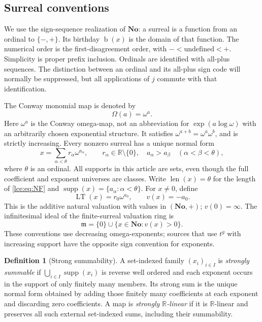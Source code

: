 \documentclass[11pt,letterpaper]{article}
\numberwithin{equation}{section}
\theoremstyle{definition}
\newtheorem{definition}[theorem]{Definition}
\theoremstyle{remark}
\newcommand{\No}{\mathbf{No}}
\newcommand{\R}{\mathbb R}
\newcommand{\supp}{\operatorname{supp}}
\newcommand{\LT}{\operatorname{LT}}
\newcommand{\bd}{\operatorname{b}}
\newcommand{\len}{\operatorname{len}}
\newcommand{\Om}{\Omega}
\newcommand{\infideal}{\mathfrak m}
\begin{document}
\subsection{Surreal conventions}
We use the sign-sequence realization of $\No$: a surreal is a function from
an ordinal to $\{-,+\}$. Its birthday $\bd(x)$ is the domain of that function.
The numerical order is the first-disagreement order, with
$-<\text{undefined}<+$. Simplicity is proper prefix inclusion.
Ordinals are identified with all-plus sequences.
The distinction between an ordinal and its all-plus sign code will normally
be suppressed, but all applications of $j$ commute with that identification.

The Conway monomial map is denoted by
\[
 \Om(a)=\omega^a.
\]
Here $\omega^a$ is the Conway omega-map, not an abbreviation for
$\exp(a\log\omega)$ with an arbitrarily chosen exponential structure.
It satisfies $\omega^{a+b}=\omega^a\omega^b$, and is strictly increasing.
Every nonzero surreal has a unique normal form
\begin{equation}\label{lce:eq:NF}
 x=\sum_{\alpha<\theta} r_\alpha\omega^{a_\alpha},
 \qquad r_\alpha\in\R\setminus\{0\},\quad
 a_\alpha>a_\beta\quad(\alpha<\beta<\theta),
\end{equation}
where $\theta$ is an ordinal. All supports in this article are sets, even
though the full coefficient and exponent universes are classes.
Write $\len(x)=\theta$ for the length of \eqref{lce:eq:NF} and
$\supp(x)=\{a_\alpha:\alpha<\theta\}$.
For $x\ne0$, define
\[
 \LT(x)=r_0\omega^{a_0},\qquad v(x)=-a_0.
\]
This is the additive natural valuation with values in $(\No,+)$; $v(0)=\infty$.
The infinitesimal ideal of the finite-surreal valuation ring is
\[
 \infideal=\{0\}\cup\{x\in\No:v(x)>0\}.
\]
These conventions use decreasing omega-exponents; sources that use $t^g$
with increasing support have the opposite sign convention for exponents.

\begin{definition}[Strong summability]\label{lce:def:strong}
A set-indexed family $(x_i)_{i\in I}$ is \emph{strongly summable} if
$\bigcup_{i\in I}\supp(x_i)$ is reverse well ordered and each exponent occurs
in the support of only finitely many members. Its strong sum is the unique
normal form obtained by adding those finitely many coefficients at each
exponent and discarding zero coefficients. A map is \emph{strongly
$\R$-linear} if it is $\R$-linear and preserves all such external set-indexed
sums, including their summability.
\end{definition}
\end{document}
